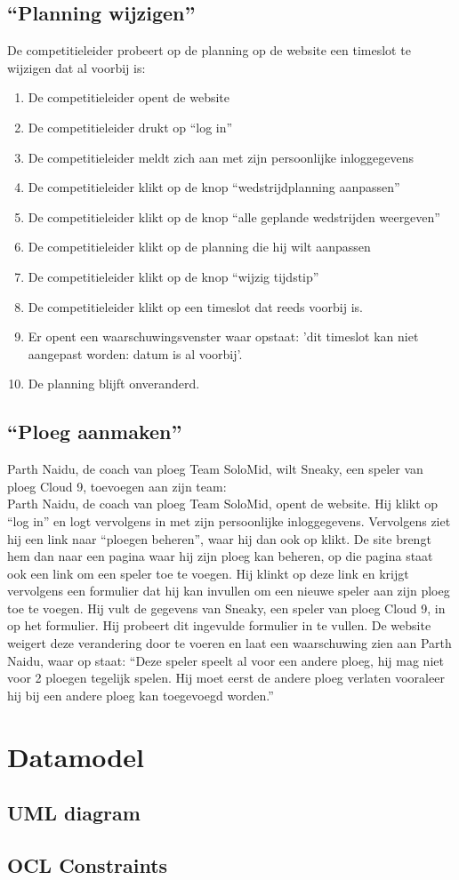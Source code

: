 \documentclass[12pt,a4paper]{article}
\begin{document}
			\subsection{``Planning wijzigen''}
			De competitieleider probeert op de planning op de website een timeslot te wijzigen dat al voorbij is:
			\begin{enumerate}
				\item De competitieleider opent de website
				\item De competitieleider drukt op “log in” 
				\item De competitieleider meldt zich aan met zijn persoonlijke inloggegevens
				\item De competitieleider klikt op de knop ``wedstrijdplanning aanpassen'' 
				\item De competitieleider klikt op de knop ``alle geplande wedstrijden weergeven''
				\item De competitieleider klikt op de planning die hij wilt aanpassen
				\item De competitieleider klikt op de knop ``wijzig tijdstip''
				\item De competitieleider klikt op een timeslot dat reeds voorbij is.
				\item Er opent een waarschuwingsvenster waar opstaat: 'dit timeslot kan niet aangepast worden: datum is al voorbij'.
				\item De planning blijft onveranderd.
			\end{enumerate}
			\subsection{``Ploeg aanmaken''}
			Parth Naidu, de coach van ploeg Team SoloMid, wilt Sneaky, een speler van ploeg Cloud 9, toevoegen aan zijn team:
			\\
			Parth Naidu, de coach van ploeg Team SoloMid, opent de website. Hij klikt op ``log in'' en logt vervolgens in met zijn persoonlijke inloggegevens. Vervolgens ziet hij een link naar ``ploegen beheren'', waar hij dan ook op klikt. De site brengt hem dan naar een pagina waar hij zijn ploeg kan beheren, op die pagina staat ook een link om een speler toe te voegen. Hij klinkt op deze link en krijgt vervolgens een formulier dat hij kan invullen om een nieuwe speler aan zijn ploeg toe te voegen. Hij vult de gegevens van Sneaky, een speler van ploeg Cloud 9, in op het formulier. Hij probeert dit ingevulde formulier in te vullen. De website weigert deze verandering door te voeren en laat een waarschuwing zien aan Parth Naidu, waar op staat: ``Deze speler speelt al voor een andere ploeg, hij mag niet voor 2 ploegen tegelijk spelen. Hij moet eerst de andere ploeg verlaten vooraleer hij bij een andere ploeg kan toegevoegd worden.''
			
			\section{Datamodel}
			\subsection{UML diagram}
			\subsection{OCL Constraints}
\end{document}
